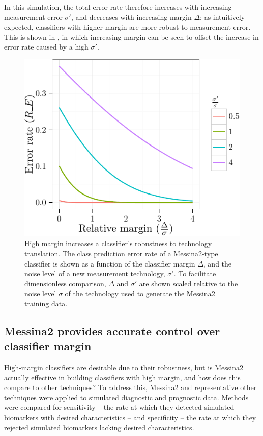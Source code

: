\documentclass[dissertation.tex]{subfiles}
\begin{document}
In this simulation, the total error rate therefore increases with increasing measurement error $\sigma'$, and decreases with increasing margin $\Delta$: as intuitively expected, classifiers with higher margin are more robust to measurement error.  This is shown in , in which increasing margin can be seen to offset the increase in error rate caused by a high $\sigma'$.

\begin{figure}[!htbp]
\centering
\includegraphics[width=.7\linewidth]{analysis/messina/figure/05-E1-E1A3-1}
\caption[High margin increases classifier robustness]{High margin increases a classifier's robustness to technology translation.  The class prediction error rate of a Messina2-type classifier is shown as a function of the classifier margin $\Delta$, and the noise level of a new measurement technology, $\sigma'$.  To facilitate dimensionless comparison, $\Delta$ and $\sigma'$ are shown scaled relative to the noise level $\sigma$ of the technology used to generate the Messina2 training data.}\label{fig:mess-margin-good}
\end{figure}

\subsection{Messina2 provides accurate control over classifier margin}
High-margin classifiers are desirable due to their robustness, but is Messina2 actually effective in building classifiers with high margin, and how does this compare to other techniques?  To address this, Messina2 and representative other techniques were applied to simulated diagnostic and prognostic data.  Methods were compared for sensitivity -- the rate at which they detected simulated biomarkers with desired characteristics -- and specificity -- the rate at which they rejected simulated biomarkers lacking desired characteristics.
\end{document}
